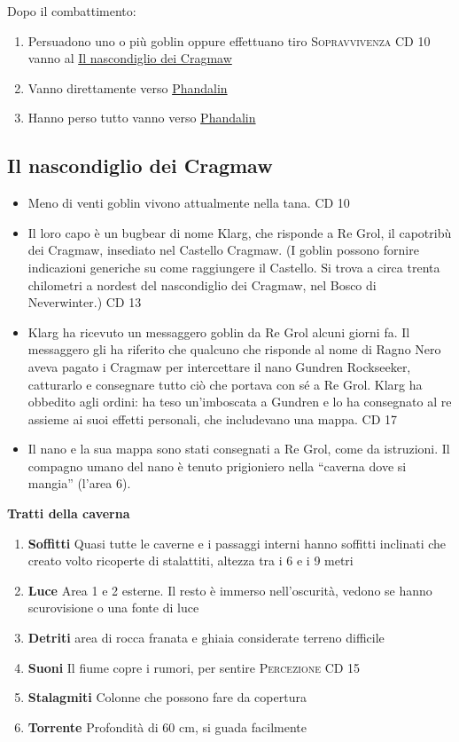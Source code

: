 \documentclass{article}
\begin{document}
Dopo il combattimento: 
    \begin{enumerate}
        \item Persuadono uno o più goblin oppure effettuano tiro \textsc{Sopravvivenza} CD 10 vanno al \hyperlink{cragmaw}{Il nascondiglio dei Cragmaw}
        \item Vanno direttamente verso \hyperlink{phandlin}{Phandalin}
        \item Hanno perso tutto vanno verso \hyperlink{phandalin}{Phandalin}
    \end{enumerate}

    \hypertarget{cragmaw}{\subsection{Il nascondiglio dei Cragmaw}}
    \begin{itemize}
        \item Meno di venti goblin vivono attualmente nella tana. CD 10
        \item  Il loro capo è un bugbear di nome Klarg, che risponde a Re
Grol, il capotribù dei Cragmaw, insediato nel Castello Cragmaw.
(I goblin possono fornire indicazioni generiche su come
raggiungere il Castello. Si trova a circa trenta chilometri a nordest
del nascondiglio dei Cragmaw, nel Bosco di Neverwinter.) CD 13
        \item Klarg ha ricevuto un messaggero goblin da Re Grol alcuni giorni fa. Il messaggero gli ha riferito che qualcuno che risponde al
nome di Ragno Nero aveva pagato i Cragmaw per intercettare il
nano Gundren Rockseeker, catturarlo e consegnare tutto ciò che portava con sé a Re Grol. Klarg ha obbedito agli ordini: ha teso
un'imboscata a Gundren e lo ha consegnato al re assieme ai suoi effetti personali, che includevano una mappa. CD 17
    \item Il nano e la sua mappa sono stati consegnati a Re Grol, come
da istruzioni. Il compagno umano del nano è tenuto prigioniero
nella “caverna dove si mangia” (l'area 6). 
    
    \end{itemize}
    \textbf{Tratti della caverna}
        \begin{enumerate}
            \item \textbf{Soffitti} Quasi tutte le caverne e i passaggi interni hanno soffitti inclinati che creato volto ricoperte di stalattiti, altezza tra i 6 e i 9 metri
            \item \textbf{Luce} Area 1 e 2 esterne. Il resto è immerso nell'oscurità, vedono se hanno scurovisione o una fonte di luce
            \item \textbf{Detriti} area di rocca franata e  ghiaia considerate terreno difficile
            \item \textbf{Suoni} Il fiume copre i rumori, per sentire \textsc{Percezione} CD 15
            \item \textbf{Stalagmiti} Colonne che possono fare da copertura
            \item \textbf{Torrente} Profondità di 60 cm, si guada facilmente
        \end{enumerate}
\end{document}
